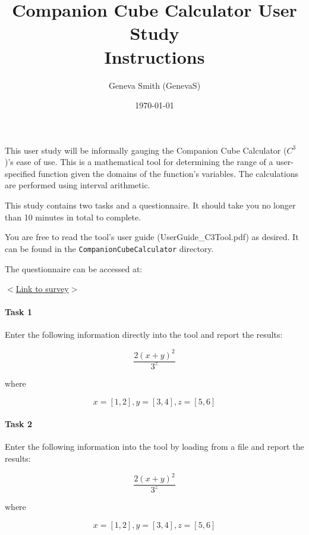 \documentclass[12pt]{article}
\title{Companion Cube Calculator User Study \\ Instructions}
\author{Geneva Smith (GenevaS)}
\date{\today}
\begin{document}
\maketitle

This user study will be informally gauging the Companion Cube Calculator 
($C^3$)'s ease of use. This is a mathematical tool for determining the range of 
a user-specified function given the domains of the function's variables. The 
calculations are performed using interval arithmetic.

This study contains two tasks and a questionnaire. It should take you no longer 
than 10 minutes in total to complete. 

You are free to read the tool's user guide (UserGuide\_C3Tool.pdf) as desired. 
It can be found in the 
\texttt{CompanionCubeCalculator} directory.

The questionnaire can be accessed at:
\begin{center}
	\href{}{$<$Link to survey$>$}
\end{center}

\paragraph{Task 1\\}
Enter the following information directly into the tool and report the results:

$$\frac{2(x + y)^2}{3^z}$$

where

$$x = [1, 2], y = [3, 4], z = [5, 6]$$

\paragraph{Task 2\\}
Enter the following information into the tool by loading from a file and report 
the results:

$$\frac{2(x + y)^2}{3^z}$$

where

$$x = [1, 2], y = [3, 4], z = [5, 6]$$
\end{document}

